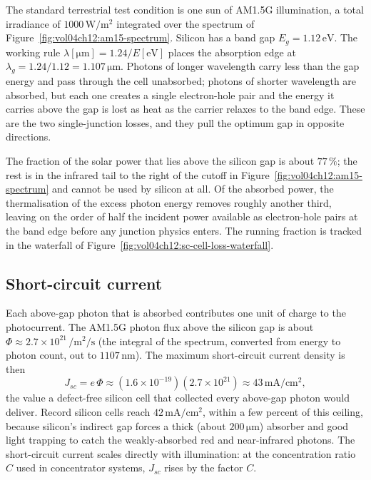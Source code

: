 The standard terrestrial test condition is one sun of AM1.5G
illumination, a total irradiance of $1000\,\si{\watt\per\meter
\squared}$ integrated over the spectrum of
Figure~\ref{fig:vol04ch12:am15-spectrum}. Silicon has a band gap
$E_{g} = 1.12\,\si{\electronvolt}$. The working rule
$\lambda[\si{\micro\meter}] = 1.24/E[\si{\electronvolt}]$ places the
absorption edge at $\lambda_{g} = 1.24/1.12 = 1.107\,\si{\micro
\meter}$. Photons of longer wavelength carry less than the gap energy
and pass through the cell unabsorbed; photons of shorter wavelength are
absorbed, but each one creates a single electron-hole pair and the
energy it carries above the gap is lost as heat as the carrier relaxes
to the band edge. These are the two single-junction losses, and they
pull the optimum gap in opposite directions.



The fraction of the solar power that lies above the silicon gap is
about $77\,\%$; the rest is in the infrared tail to the right of the
cutoff in Figure~\ref{fig:vol04ch12:am15-spectrum} and cannot be used
by silicon at all. Of the absorbed power, the thermalisation of the
excess photon energy removes roughly another third, leaving on the
order of half the incident power available as electron-hole pairs at
the band edge before any junction physics enters. The running fraction
is tracked in the waterfall of
Figure~\ref{fig:vol04ch12:sc-cell-loss-waterfall}.



\subsection{Short-circuit current}

Each above-gap photon that is absorbed contributes one unit of charge
to the photocurrent. The AM1.5G photon flux above the silicon gap is
about $\Phi \approx 2.7\times 10^{21}\,\si{\per\meter\squared\per
\second}$ (the integral of the spectrum, converted from energy to
photon count, out to $1107\,\si{\nano\meter}$). The maximum
short-circuit current density is then
\[
J_{sc} = e\,\Phi \approx (1.6\times 10^{-19})(2.7\times 10^{21})
\approx 43\,\si{\milli\ampere\per\centi\meter\squared},
\]
the value a defect-free silicon cell that collected every above-gap
photon would deliver. Record silicon cells reach $42\,\si{\milli
\ampere\per\centi\meter\squared}$, within a few percent of this
ceiling, because silicon's indirect gap forces a thick (about
$200\,\si{\micro\meter}$) absorber and good light trapping to catch the
weakly-absorbed red and near-infrared photons. The short-circuit
current scales directly with illumination: at the concentration ratio
$C$ used in concentrator systems, $J_{sc}$ rises by the factor $C$.


